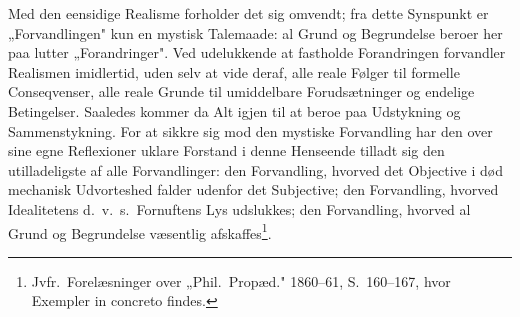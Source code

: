 \documentclass[12pt]{book}
\begin{document}
Med den eensidige Realisme forholder det sig omvendt; fra dette Synspunkt er
„Forvandlingen" kun en mystisk Talemaade: al Grund og Begrundelse beroer her paa
lutter „Forandringer". Ved udelukkende at fastholde Forandringen forvandler Realismen
imidlertid, uden selv at vide deraf, alle reale Følger til formelle Conseqvenser, alle
reale Grunde til umiddelbare Forudsætninger og endelige Betingelser. Saaledes kommer
da Alt igjen til at beroe paa Udstykning og Sammenstykning. For at sikkre sig mod den
mystiske Forvandling har den over sine egne Reflexioner uklare Forstand i denne
Henseende tilladt sig den utilladeligste af alle Forvandlinger: den Forvandling,
hvorved det Objective i død mechanisk Udvorteshed falder udenfor det Subjective; den
Forvandling, hvorved Idealitetens d.\ v.\ s.\ Fornuftens Lys udslukkes; den
Forvandling, hvorved al Grund og Begrundelse væsentlig afskaffes\footnote{Jvfr.\
Forelæsninger over „Phil.\ Propæd." 1860--61, S.~160--167, hvor Exempler in concreto
findes.}.
\end{document}
